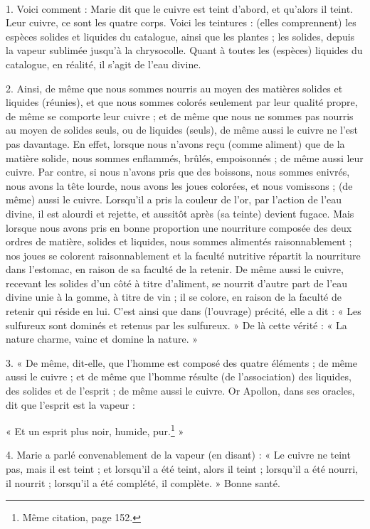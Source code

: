 \documentclass[landscape, a4paper, 11pt, oneside, polutonikogreek, french]{article}
\begin{document}
\paragraph{}
1. Voici comment : Marie dit que le cuivre est teint d'abord, et qu'alors il teint. Leur cuivre, ce sont les quatre corps. Voici les teintures : (elles comprennent) les espèces solides et liquides du catalogue, ainsi que les plantes ; les solides, depuis la vapeur sublimée jusqu'à la chrysocolle. Quant à toutes les (espèces) liquides du catalogue, en réalité, il s'agit de l'eau divine.

2. Ainsi, de même que nous sommes nourris au moyen des matières solides et liquides (réunies), et que nous sommes colorés seulement par leur qualité propre, de même se comporte leur cuivre ; et de même que nous ne sommes pas nourris au moyen de solides seuls, ou de liquides (seuls), de même aussi le cuivre ne l'est pas davantage. En effet, lorsque nous n'avons reçu (comme aliment) que de la matière solide, nous sommes enflammés, brûlés, empoisonnés ; de même aussi leur cuivre. Par contre, si nous n'avons pris que des boissons, nous sommes enivrés, nous avons la tête lourde, nous avons les joues colorées, et nous vomissons ; (de même) aussi le cuivre. Lorsqu'il a pris la couleur de l'or, par l'action de l'eau divine, il est alourdi et rejette, et aussitôt après (sa teinte) devient fugace. Mais lorsque nous avons pris en bonne proportion une nourriture composée des deux ordres de matière, solides et liquides, nous sommes alimentés raisonnablement ; nos joues se colorent raisonnablement et la faculté nutritive répartit la nourriture dans l'estomac, en raison de sa faculté de la retenir. De même aussi le cuivre, recevant les solides d'un côté à titre d'aliment, se nourrit d'autre part de l'eau divine unie à la gomme, à titre de vin ; il se colore, en raison de la faculté de retenir qui réside en lui. C'est ainsi que dans (l'ouvrage) précité, elle a dit : « Les sulfureux sont dominés et retenus par les sulfureux. » De là cette vérité : « La nature charme, vainc et domine la nature. »

3. « De même, dit-elle, que l'homme est composé des quatre éléments ; de même aussi le cuivre ; et de même que l'homme résulte (de l'association) des liquides, des solides et de l'esprit ; de même aussi le cuivre. Or Apollon, dans ses oracles, dit que l'esprit est la vapeur :

« Et un esprit plus noir, humide, pur.\footnote{Même citation, page 152.} »

4. Marie a parlé convenablement de la vapeur (en disant) : « Le cuivre ne teint pas, mais il est teint ; et lorsqu'il a été teint, alors il teint ; lorsqu'il a été nourri, il nourrit ; lorsqu'il a été complété, il complète. » Bonne santé.
\end{document}
